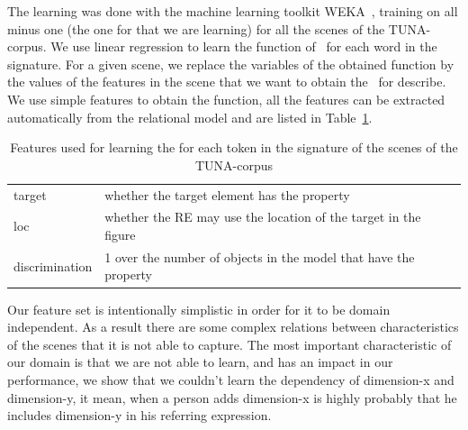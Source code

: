 The learning was done with the machine learning toolkit WEKA~\cite{Hall:WEK09}, training on all minus one (the one for that we are learning) for all the scenes of the TUNA-corpus. We use linear regression to learn the function of \puse\ for each word in the signature. 
For a given scene, we replace the variables of the obtained function by the values of the features in the scene that we want to obtain the \puse\ for describe. 
We use simple features to obtain the function, all the features can be extracted automatically from the relational model and are listed 
in Table~\ref{features}.  

\begin{small}
\begin{table}[h!]
\begin{center}
\begin{tabular}{|l|p{10cm}|}
\hline
target & whether the target element has the property \\
loc & whether the RE may use the location of the target in the figure\\
discrimination & 1 over the number of objects in the model that have the property \\
\hline
\end{tabular}
\caption{Features used for learning the \puse for each token in the signature of the scenes of the TUNA-corpus} 
\label{features}
\end{center}
\end{table}
\end{small}
Our feature set is intentionally simplistic in order for it to be domain independent. As a result there are some complex relations 
between characteristics of the scenes that it is not able to capture. The most important characteristic of our domain is that we are not able 
to learn, and has an impact in our performance, we show that we couldn't learn the dependency of dimension-x and dimension-y, it mean, when a person adds dimension-x is highly probably that he includes dimension-y in his referring expression. 
